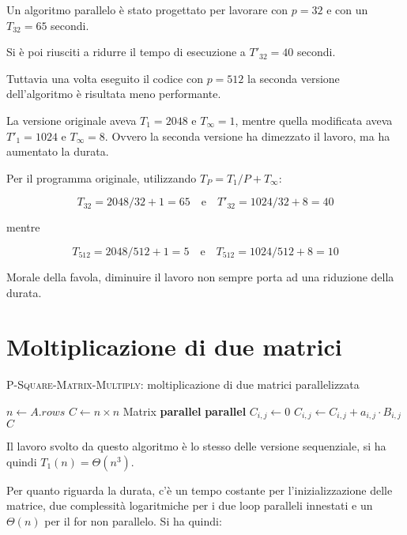 Un algoritmo parallelo è stato progettato per lavorare con $p = 32$ e con
un $T_{32} = 65 $ secondi.

Si è poi riusciti a ridurre il tempo di esecuzione a $T'_{32} = 40$ secondi.

Tuttavia una volta eseguito il codice con $p = 512$ la seconda versione dell'algoritmo è risultata meno performante.

La versione originale aveva $T_1 = 2048$ e $T_\infty = 1$, mentre quella modificata aveva $T'_1 = 1024$ e $T_\infty = 8$. Ovvero la seconda versione ha dimezzato il lavoro, ma ha aumentato la durata.

Per il programma originale, utilizzando $T_P = T_1/P + T_\infty$:

$$T_{32} = 2048/32 +1 = 65 \quad \text{e} \quad T'_{32} = 1024/32 +8 = 40$$

mentre

$$T_{512} = 2048/512 + 1 = 5 \quad \text{e} \quad  T_{512} = 1024/512 + 8 = 10$$

Morale della favola, diminuire il lavoro non sempre porta ad una riduzione della durata.

\section{Moltiplicazione di due matrici}

\begin{breakablealgorithm}
	\caption{\textsc{P-Square-Matrix-Multiply}: moltiplicazione di due matrici parallelizzata}
	\begin{algorithmic}[1]
			\State $n \gets A.rows$
			\State $C \gets n \times n $ Matrix
			\State \textbf{parallel}
				\State \textbf{parallel}
					\State $C_{i,j} \gets 0$
						\State $C_{i,j} \gets C_{i,j} + a_{i,j} \cdot B_{i,j}$
					\EndFor
				\EndFor
			\EndFor
			\State \Return $C$
		\EndFunction
	\end{algorithmic}
\end{breakablealgorithm}

Il lavoro svolto da questo algoritmo è lo stesso delle versione sequenziale, si ha quindi $T_1(n) = \Theta(n^3)$.

Per quanto riguarda la durata, c'è un tempo costante per l'inizializzazione delle matrice, due complessità logaritmiche per i due loop paralleli innestati e un $\Theta(n)$ per il for non parallelo. Si ha quindi:

